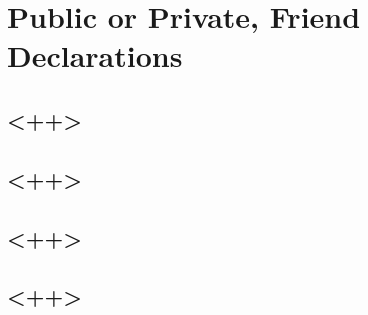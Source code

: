 \chapter{Public or Private, Friend Declarations}

\section{<++>}

\section{<++>}

\section{<++>}

\section{<++>}

